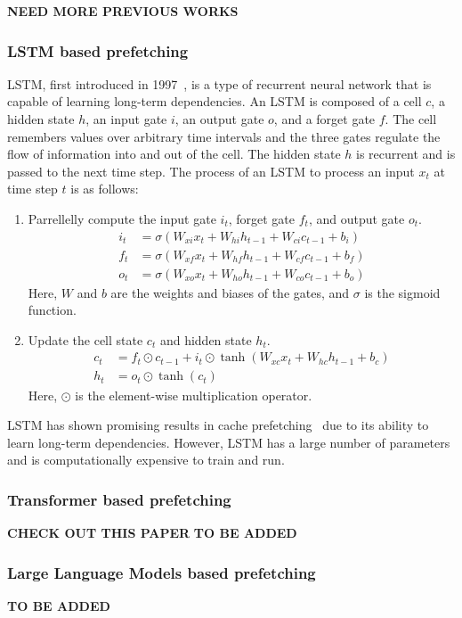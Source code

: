 \textbf{NEED MORE PREVIOUS WORKS}

\subsubsection{LSTM based prefetching}

LSTM, first introduced in 1997~\cite{LSTM}, is a type of recurrent neural network that is capable of learning long-term dependencies. An LSTM is composed of a cell $c$, a hidden state $h$, an input gate $i$, an output gate $o$, and a forget gate $f$. The cell remembers values over arbitrary time intervals and the three gates regulate the flow of information into and out of the cell. The hidden state $h$ is recurrent and is passed to the next time step. The process of an LSTM to process an input $x_t$ at time step $t$ is as follows:

\begin{enumerate}
    \item Parrellelly compute the input gate $i_t$, forget gate $f_t$, and output gate $o_t$.\begin{align*}
        i_t &= \sigma(W_{xi}x_t + W_{hi}h_{t-1} + W_{ci}c_{t-1} + b_i)\\
        f_t &= \sigma(W_{xf}x_t + W_{hf}h_{t-1} + W_{cf}c_{t-1} + b_f)\\
        o_t &= \sigma(W_{xo}x_t + W_{ho}h_{t-1} + W_{co}c_{t-1} + b_o)
    \end{align*}
    Here, $W$ and $b$ are the weights and biases of the gates, and $\sigma$ is the sigmoid function.
    \item Update the cell state $c_t$ and hidden state $h_t$.\begin{align*}
        c_t &= f_t \odot c_{t-1} + i_t \odot \tanh(W_{xc}x_t + W_{hc}h_{t-1} + b_c)\\
        h_t &= o_t \odot \tanh(c_t)
    \end{align*}
    Here, $\odot$ is the element-wise multiplication operator.
\end{enumerate}

LSTM has shown promising results in cache prefetching~\cite{LMAP} due to its ability to learn long-term dependencies. However, LSTM has a large number of parameters and is computationally expensive to train and run. 

\subsubsection{Transformer based prefetching}

\textbf{CHECK OUT THIS PAPER}
\cite{Twilight}
\textbf{TO BE ADDED}

\subsubsection{Large Language Models based prefetching}

\textbf{TO BE ADDED}
